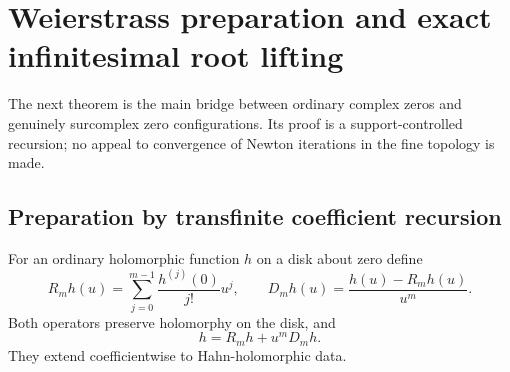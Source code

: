 \documentclass[11pt,letterpaper]{article}
\theoremstyle{definition}
\theoremstyle{remark}
\numberwithin{equation}{section}
\begin{document}
\section{Weierstrass preparation and exact infinitesimal root lifting}\label{sec:preparation}
The next theorem is the main bridge between ordinary complex zeros and genuinely surcomplex zero configurations. Its proof is a support-controlled recursion; no appeal to convergence of Newton iterations in the fine topology is made.

\subsection{Preparation by transfinite coefficient recursion}
For an ordinary holomorphic function $h$ on a disk about zero define
\[
 R_mh(u)=\sum_{j=0}^{m-1}\frac{h^{(j)}(0)}{j!}u^j,
 \qquad
 D_mh(u)=\frac{h(u)-R_mh(u)}{u^m}.
\]
Both operators preserve holomorphy on the disk, and
\begin{equation}\label{eq:divisionoperators}
 h=R_mh+u^mD_mh.
\end{equation}
They extend coefficientwise to Hahn-holomorphic data.
\end{document}
